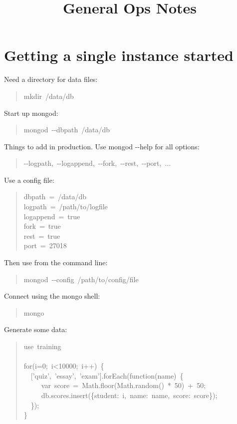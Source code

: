 \documentclass[letter]{article}
\title{\phantomsection%
  General Ops Notes%
  \label{general-ops-notes}}
\author{}
\date{}
\begin{document}
\maketitle


\section{Getting a single instance started%
  \label{getting-a-single-instance-started}%
}

Need a directory for data files:
%
\begin{quote}{\ttfamily \raggedright \noindent
mkdir~/data/db
}
\end{quote}

Start up mongod:
%
\begin{quote}{\ttfamily \raggedright \noindent
mongod~-{}-dbpath~/data/db
}
\end{quote}

Things to add in production. Use mongod -{}-help for all options:
%
\begin{quote}{\ttfamily \raggedright \noindent
-{}-logpath,~-{}-logappend,~-{}-fork,~-{}-rest,~-{}-port,~...
}
\end{quote}

Use a config file:
%
\begin{quote}{\ttfamily \raggedright \noindent
dbpath~=~/data/db\\
logpath~=~/path/to/logfile\\
logappend~=~true\\
fork~=~true\\
rest~=~true\\
port~=~27018
}
\end{quote}

Then use from the command line:
%
\begin{quote}{\ttfamily \raggedright \noindent
mongod~-{}-config~/path/to/config/file
}
\end{quote}

Connect using the mongo shell:
%
\begin{quote}{\ttfamily \raggedright \noindent
mongo
}
\end{quote}

Generate some data:
%
\begin{quote}{\ttfamily \raggedright \noindent
use~training\\
~\\
for(i=0;~i<10000;~i++)~\{\\
~~{[}'quiz',~'essay',~'exam'{]}.forEach(function(name)~\{\\
~~~~~var~score~=~Math.floor(Math.random()~*~50)~+~50;\\
~~~~~db.scores.insert(\{student:~i,~name:~name,~score:~score\});\\
~~\});\\
\}
}
\end{quote}
\end{document}
